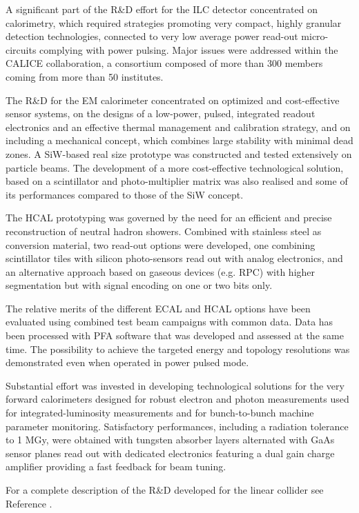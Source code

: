 \documentclass[%
 reprint,
 amsmath,amssymb,
 aps,
]{revtex4-1}
\begin{document}
A significant part of the R\&D effort for the ILC detector concentrated on calorimetry, which required strategies promoting very compact, highly granular detection technologies, connected to very low average power read-out micro-circuits complying with power pulsing. Major issues were addressed within the CALICE collaboration, a consortium composed of more than 300 members coming from more than 50 institutes.

The R\&D for the EM calorimeter concentrated on optimized and cost-effective sensor systems, on the designs of a low-power, pulsed, integrated readout electronics and an effective thermal management and calibration strategy, and on including a mechanical concept, which combines large stability with minimal dead zones. A SiW-based real size prototype was constructed and tested extensively on particle beams. The development of a more cost-effective technological solution, based on a scintillator and photo-multiplier matrix was also realised and some of its performances compared to those of the SiW concept.

The HCAL prototyping was governed by the need for an efficient and precise reconstruction of neutral hadron showers. Combined with stainless steel as conversion material, two read-out options were developed, one combining scintillator tiles with silicon photo-sensors read out with analog electronics, and an alternative approach based on gaseous devices (e.g. RPC) with higher segmentation but with signal encoding on one or two bits only.

The relative merits of the different ECAL and HCAL options have been evaluated using combined test beam campaigns with common data.  Data has been processed with PFA software that was developed and assessed at the same time. The possibility to achieve the targeted energy and topology resolutions was demonstrated even when operated in power pulsed mode.

Substantial effort was invested in developing technological solutions for the very forward calorimeters designed for robust electron and photon measurements used for integrated-luminosity measurements and for bunch-to-bunch machine parameter monitoring. Satisfactory performances, including a radiation tolerance to 1 MGy, were obtained with tungsten absorber layers alternated with GaAs sensor planes read out with dedicated electronics featuring a dual gain charge amplifier providing a fast feedback for beam tuning.

For a complete description of the R\&D developed for the linear collider see Reference \cite{RDliaision}.
\end{document}
